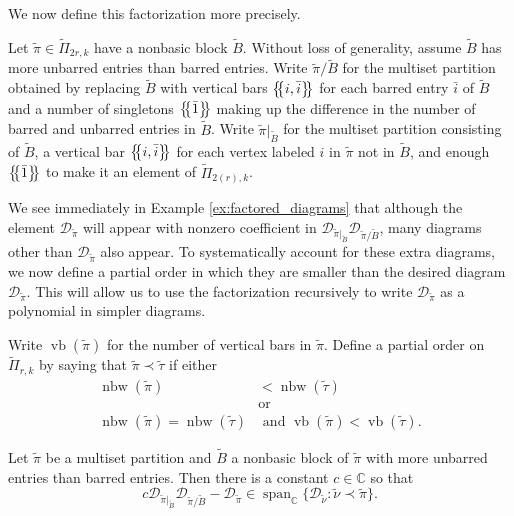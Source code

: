 \documentclass[ALCO,Unicode,published]{cedram}
\newcommand{\C}{\mathbb{C}}
\newcommand{\DD}{\mathcal{D}}
\newcommand{\ttau}{{\tilde{\tau}}}
\newcommand{\tpi}{{\tilde{\pi}}}
\newcommand{\tnu}{{\tilde{\nu}}}
\newcommand{\tB}{{\tilde{B}}}
\newcommand{\multi}[1]{\left\{\mskip-5mu\left\{#1\right\}\mskip-5mu\right\}}
\newcommand{\ov}[1]{\bar{#1}}
\DeclareMathOperator{\nbw}{nbw}
\DeclareMathOperator{\vb}{vb}
\DeclareMathOperator{\Span}{span}
\begin{document}
We now define this factorization more precisely.

\begin{defi}
    Let $\tpi\in\tilde{\Pi}_{2r,k}$ have a nonbasic block $\tB$. Without loss of generality, assume $\tB$ has more unbarred entries than barred entries. Write $\tpi/\tB$ for the multiset partition obtained by replacing $\tB$ with vertical bars $\multi{i,\ov i}$ for each barred entry $\ov i$ of $\tB$ and a number of singletons $\multi{\ov 1}$ making up the difference in the number of barred and unbarred entries in $\tB$. Write $\tpi|_{\tB}$ for the multiset partition consisting of $\tB$, a vertical bar $\multi{i,\ov i}$ for each vertex labeled $i$ in $\tpi$ not in $\tB$, and enough $\multi{\ov1}$ to make it an element of $\tilde\Pi_{2(r),k}$.
\end{defi}

 We see immediately in Example \ref{ex:factored_diagrams} that although the element $\DD_\tpi$ will appear with nonzero coefficient in $\DD_{\tpi|_{\tB}}\DD_{\tpi/\tB}$, many diagrams other than $\DD_\tpi$ also appear. To systematically account for these extra diagrams, we now define a partial order in which they are smaller than the desired diagram $\DD_\tpi$. This will allow us to use the factorization recursively to write $\DD_\tpi$ as a polynomial in simpler diagrams.

 Write $\vb(\tpi)$ for the number of vertical bars in $\tpi$. Define a partial order on $\tilde{\Pi}_{r,k}$ by saying that $\tpi\prec\ttau$ if either \begin{align*}
    \nbw(\tpi)&<\nbw(\ttau)\\
    &\text{or}\\
    \nbw(\tpi)=\nbw(\ttau)&\text{ and }\vb(\tpi)<\vb(\ttau).
\end{align*}

\begin{lemma}\label{lem:factorize}
    Let $\tpi$ be a multiset partition and $\tB$ a nonbasic block of $\tpi$ with more unbarred entries than barred entries. Then there is a constant $c\in\C$ so that \[c\DD_{\tpi|_{\tB}}\DD_{\tpi/\tB}-\DD_\tpi\in\Span_\C\{\DD_\tnu:\tnu\prec\tpi\}.\]
\end{lemma}
\end{document}
